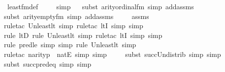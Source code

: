 \begin{isabellebody}
\ least{\isacharunderscore}{\kern0pt}fm{\isacharunderscore}{\kern0pt}def\ \isanewline
\ \ \isamarkupfalse%
\ simp\isanewline
\ \ \isamarkupfalse%
{\isacharparenleft}{\kern0pt}subst\ arity{\isacharunderscore}{\kern0pt}ordinal{\isacharunderscore}{\kern0pt}fm{\isacharcomma}{\kern0pt}\ simp\ add{\isacharcolon}{\kern0pt}assms{\isacharparenright}{\kern0pt}\isanewline
\ \ \isamarkupfalse%
{\isacharparenleft}{\kern0pt}subst\ arity{\isacharunderscore}{\kern0pt}empty{\isacharunderscore}{\kern0pt}fm{\isacharcomma}{\kern0pt}\ simp\ add{\isacharcolon}{\kern0pt}assms{\isacharparenright}{\kern0pt}\ \isanewline
\ \ \isamarkupfalse%
\ assms\isanewline
\ \ \isamarkupfalse%
{\isacharparenleft}{\kern0pt}rule{\isacharunderscore}{\kern0pt}tac\ Un{\isacharunderscore}{\kern0pt}least{\isacharunderscore}{\kern0pt}lt{\isacharcomma}{\kern0pt}\ simp{\isacharcomma}{\kern0pt}\ rule{\isacharunderscore}{\kern0pt}tac\ ltI{\isacharcomma}{\kern0pt}\ simp{\isacharcomma}{\kern0pt}\ simp{\isacharparenright}{\kern0pt}{\isacharplus}{\kern0pt}\isanewline
\ \ \ \ \isamarkupfalse%
{\isacharparenleft}{\kern0pt}rule\ ltD{\isacharcomma}{\kern0pt}\ rule\ Un{\isacharunderscore}{\kern0pt}least{\isacharunderscore}{\kern0pt}lt{\isacharcomma}{\kern0pt}\ simp{\isacharcomma}{\kern0pt}\ rule{\isacharunderscore}{\kern0pt}tac\ ltI{\isacharcomma}{\kern0pt}\ simp{\isacharcomma}{\kern0pt}\ simp{\isacharparenright}{\kern0pt}\isanewline
\ \ \ \ \isamarkupfalse%
{\isacharparenleft}{\kern0pt}rule\ pred{\isacharunderscore}{\kern0pt}le{\isacharcomma}{\kern0pt}\ simp{\isacharcomma}{\kern0pt}\ simp{\isacharcomma}{\kern0pt}\ rule\ Un{\isacharunderscore}{\kern0pt}least{\isacharunderscore}{\kern0pt}lt{\isacharcomma}{\kern0pt}\ simp{\isacharparenright}{\kern0pt}\isanewline
\ \ \ \ \isamarkupfalse%
{\isacharparenleft}{\kern0pt}rule{\isacharunderscore}{\kern0pt}tac\ n{\isacharequal}{\kern0pt}{\isachardoublequoteopen}arity{\isacharparenleft}{\kern0pt}p{\isacharparenright}{\kern0pt}{\isachardoublequoteclose}\ \ natE{\isacharcomma}{\kern0pt}\ simp{\isacharcomma}{\kern0pt}\ simp{\isacharparenright}{\kern0pt}\isanewline
\ \ \ \ \isamarkupfalse%
{\isacharparenleft}{\kern0pt}subst\ succ{\isacharunderscore}{\kern0pt}Un{\isacharunderscore}{\kern0pt}distrib{\isacharcomma}{\kern0pt}\ simp{\isacharcomma}{\kern0pt}\ simp{\isacharparenright}{\kern0pt}\isanewline
\ \ \ \ \isamarkupfalse%
{\isacharparenleft}{\kern0pt}subst\ succ{\isacharunderscore}{\kern0pt}pred{\isacharunderscore}{\kern0pt}eq{\isacharcomma}{\kern0pt}\ simp{\isacharcomma}{\kern0pt}\ simp{\isacharparenright}{\kern0pt}\isanewline

\end{isabellebody}
